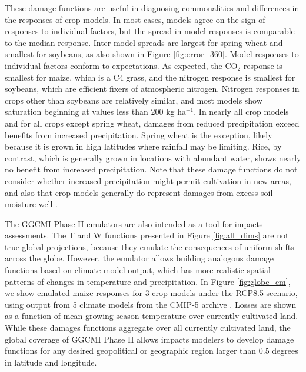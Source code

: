 \documentclass[gmd, manuscript]{copernicus} %
\begin{document}
These damage functions are useful in diagnosing commonalities and differences in the responses of crop models. 
In most cases, models agree on the sign of responses to individual factors, but the spread in model responses is comparable to the median response. Inter-model spreads are largest for spring wheat and smallest for soybeans, as also shown in Figure \ref{fig:error_360}.
Model responses to individual factors conform to expectations. As expected, the CO$_2$ response is smallest for maize, which is a C4 grass, and the nitrogen response is smallest for soybeans, which are efficient fixers of atmospheric nitrogen. Nitrogen responses in crops other than soybeans are relatively similar, and most models show saturation beginning at values less than 200 kg ha$^{-1}$.
 In nearly all crop models and for all crops except spring wheat, damages from reduced precipitation exceed benefits from increased precipitation. Spring wheat is the exception, likely because it is grown in high latitudes where rainfall may be limiting. Rice, by contrast, which is generally grown in locations with abundant water, shows nearly no benefit from increased precipitation.
Note that these damage functions do not consider whether increased precipitation might permit cultivation in new areas, and also that crop models generally do represent damages from excess soil moisture well \citep{Li2019}.

The GGCMI Phase II emulators are also intended as a tool for impacts assessments.
The T and W functions presented in Figure \ref{fig:all_dims} are not true global projections, because they emulate the consequences of uniform shifts across the globe. %
However, the emulator allows building analogous damage functions based on climate model output, which has more realistic spatial patterns of changes in temperature and precipitation. 
In Figure \ref{fig:globe_em}, we show emulated maize responses for 3 crop models under the RCP8.5 scenario, using output from 5 climate models from the CMIP-5 archive \citep{Taylor2012}. Losses are shown as a function of mean growing-season temperature over currently cultivated land. While these damages functions aggregate over all currently cultivated land, the global coverage of GGCMI Phase II allows impacts modelers to develop damage functions for any desired geopolitical or geographic region larger than 0.5 degrees in latitude and longitude. 
\end{document}
